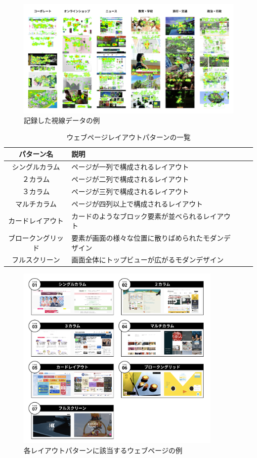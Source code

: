\begin{figure}[H]
  \centering
  \includegraphics[width=12.5cm]{figures/05_dataset_saliency.jpg}
  \caption{記録した視線データの例}
  \label{fig_dataset-saliency}
\end{figure}

\begin{table}[h]
  \caption{ウェブページレイアウトパターンの一覧}
  \label{table:layoutpattern}
  \centering
    \begin{tabular}{clll}
    \hline
    パターン名 & 説明 \\
    \hline \hline
    シングルカラム & ページが一列で構成されるレイアウト \\
    ２カラム & ページが二列で構成されるレイアウト \\
    ３カラム & ページが三列で構成されるレイアウト \\
    マルチカラム & ページが四列以上で構成されるレイアウト \\
    カードレイアウト & カードのようなブロック要素が並べられるレイアウト \\
    ブロークングリッド & 要素が画面の様々な位置に散りばめられたモダンデザイン \\
    フルスクリーン & 画面全体にトップビューが広がるモダンデザイン \\
    \hline
  \end{tabular}
\end{table}

\begin{figure}[H]
  \centering
  \includegraphics[width=10cm]{figures/05_layout.jpg}
  \caption{各レイアウトパターンに該当するウェブページの例}
  \label{fig_layout_example}
\end{figure}


